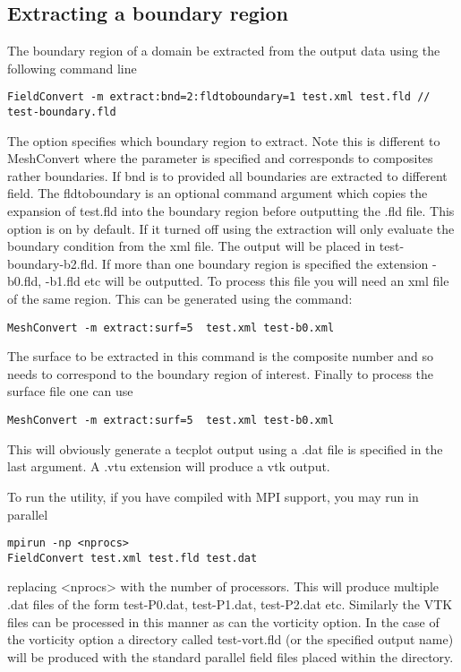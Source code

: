 \subsection{Extracting a boundary region}
The boundary region of a domain be extracted from the output data using the following command line
\begin{lstlisting}[style=BashInputStyle]
FieldConvert -m extract:bnd=2:fldtoboundary=1 test.xml test.fld //
test-boundary.fld
\end{lstlisting}
The option  specifies which boundary region to extract. Note this is different to MeshConvert where the parameter  is specified and corresponds to composites rather boundaries. If bnd is to provided all boundaries are extracted to different field. The fldtoboundary is an optional command argument which copies the expansion of test.fld into the boundary region before outputting the .fld file. This option is on by default. If it turned off using  the extraction will only evaluate the boundary condition from the xml file. The output will be placed in test-boundary-b2.fld. If more than one boundary region is specified the extension -b0.fld, -b1.fld etc will be outputted. To process this file you will need an xml file of the same region. This can be generated using the command:
\begin{lstlisting}[style=BashInputStyle]
MeshConvert -m extract:surf=5  test.xml test-b0.xml
\end{lstlisting}
The surface to be extracted in this command is the composite number and so needs to correspond to the boundary region of interest. Finally to process the surface file one can use
\begin{lstlisting}[style=BashInputStyle]
MeshConvert -m extract:surf=5  test.xml test-b0.xml
\end{lstlisting}
This will obviously generate a tecplot output using a .dat file is specified in the last argument. A .vtu extension will produce a vtk output.

To run the utility, if you have compiled \nekpp with MPI support, you may run in
parallel
\begin{lstlisting}[style=BashInputStyle] mpirun -np <nprocs>
FieldConvert test.xml test.fld test.dat
\end{lstlisting}
replacing <nprocs> with the number of processors. This will produce multiple
.dat files of the form test-P0.dat, test-P1.dat, test-P2.dat etc. Similarly the
VTK files can be processed in this manner as can the vorticity option. In the
case of the vorticity option a directory called test-vort.fld (or the specified
output name) will be produced with the standard parallel field files placed
within the directory.
